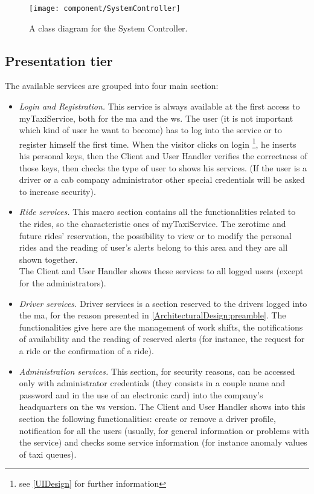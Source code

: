 \documentclass[\mainpath/main]{subfiles}
\begin{document}
\begin{figure}[ht!]
	\centering
	\texttt{[image: component/SystemController]}
	\caption{A class diagram for the System Controller.}
	\label{ArchitecturalDesign:systemController}
\end{figure}


\subsection{Presentation tier}
\label{ArchitecturalDesign:services}

The available services are grouped into four main section:\\
\begin{itemize}
	\item \textit{Login and Registration.} This service is always available at the first access to myTaxiService, both for the \gls{ma} and the \gls{ws}. The user (it is not important which kind of user he want to become) has to log into the service or to register himself the first time. When the visitor clicks on login \footnote{see \autoref{UIDesign} for further information}, he inserts his personal keys, then the Client and User Handler verifies the correctness of those keys, then checks the type of user to shows his services. (If the user is a driver or a cab company administrator other special credentials will be asked to increase security).\\
	
	\item \textit{Ride services.} This macro section contains all the functionalities related to the rides, so the characteristic ones of myTaxiService. The zerotime and future rides' reservation, the possibility to view or to modify the personal rides and the reading of user's alerts belong to this area and they are all shown together.\\
	The Client and User Handler shows these services to all logged users (except for the administrators).\\
	
	\item \textit{Driver services.} Driver services is a section reserved to the drivers logged into the \gls{ma}, for the reason presented in \autoref{ArchitecturalDesign:preamble}. The functionalities give here are the management of work shifts, the notifications of availability and the reading of reserved alerts (for instance, the request for a ride or the confirmation of a ride).\\
	
	\item \textit{Administration services.} This section, for security reasons, can be accessed only with administrator credentials (they consists in a couple name and password and in the use of an electronic card) into the company's headquarters on the \gls{ws} version. The Client and User Handler shows into this section the following functionalities: create or remove a driver profile, notification for all the users (usually, for general information or problems with the service) and checks some service information (for instance anomaly values of taxi queues).
\end{itemize}
\end{document}
